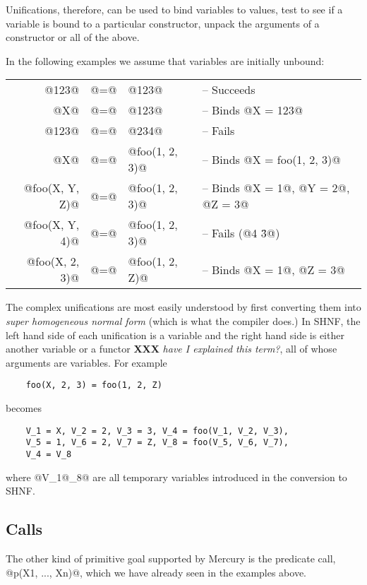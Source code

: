 \documentclass[a4paper,11pt,notitlepage,onecolumn]{article}
\newcommand{\XXX}[1]%
{{\small\textbf{XXX} \emph{#1}}}
\begin{document}
Unifications, therefore, can be used to bind variables to
values, test to see if a variable is bound to a particular
constructor, unpack the arguments of a constructor or all of
the above.

In the following examples we assume that variables are
initially unbound:

\begin{tabular}{rcll}
         @123@ & @=@ & @123@ &
                -- Succeeds \\
           @X@ & @=@ & @123@ &
                -- Binds @X = 123@ \\
         @123@ & @=@ & @234@ &
                -- Fails \\
           @X@ & @=@ & @foo(1, 2, 3)@ &
                -- Binds @X = foo(1, 2, 3)@ \\
@foo(X, Y, Z)@ & @=@ & @foo(1, 2, 3)@ &
                -- Binds @X = 1@, @Y = 2@, @Z = 3@ \\
@foo(X, Y, 4)@ & @=@ & @foo(1, 2, 3)@ &
                -- Fails (@4 \= 3@) \\
@foo(X, 2, 3)@ & @=@ & @foo(1, 2, Z)@ &
                -- Binds @X = 1@, @Z = 3@ \\
\end{tabular}

The complex unifications are most easily understood by first
converting them into \emph{super homogeneous normal form} (which is
what the compiler does.)  In SHNF, the left hand side of each
unification is a variable and the right hand side is either
another variable or a functor \XXX{have I explained this term?}, all of
whose arguments are variables.  For example

\begin{verbatim}
    foo(X, 2, 3) = foo(1, 2, Z)
\end{verbatim}
becomes
\begin{verbatim}
    V_1 = X, V_2 = 2, V_3 = 3, V_4 = foo(V_1, V_2, V_3),
    V_5 = 1, V_6 = 2, V_7 = Z, V_8 = foo(V_5, V_6, V_7),
    V_4 = V_8
\end{verbatim}
where @V_1@\ldots@V_8@ are all temporary variables
introduced in the conversion to SHNF.

\subsection{Calls}
The other kind of primitive goal supported by Mercury is the
predicate call, @p(X1, ..., Xn)@, which we have already seen in
the examples above.
\end{document}
